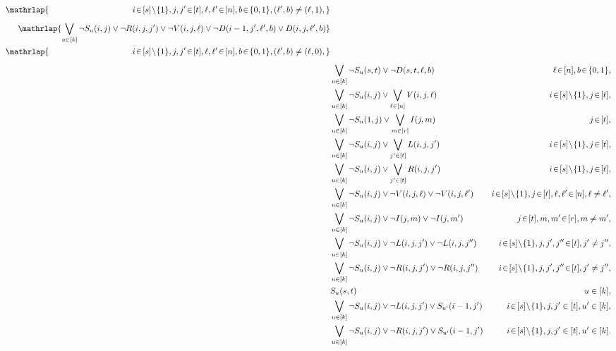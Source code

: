 \documentclass[10pt,a4paper]{article}
\theoremstyle{remark}
\newtheorem*{switching lemma}{Switching Lemma}
\newtheorem*{open problem}{Open Problem}
\theoremstyle{definition}
\begin{document}
\begin{alignat}{2}
\begin{split}
\mathrlap{  \, \, \, \, \, \, \, \; \; \; \quad \quad \qquad \qquad \qquad  i \! \in \! [s] \! \setminus \! \{1\}, j,j' \! \in \! [t], \ell,\ell' \! \in \! [n], b \! \in \! \{0,1\}, (\ell',b) \neq (\ell,1),} 
\end{split} \\[1ex]
\begin{split}
\label{rrefclause:res-R-transf} \mathrlap{ \bigvee_{u\in [k]} \neg S_u(i,j) \lor \neg R(i,j,j') \lor \neg V(i,j,\ell) \lor \neg D(i-1,j',\ell',b) \lor D(i,j,\ell',b)} \\
 \mathrlap{  \, \, \, \, \, \, \, \; \; \; \quad \quad \qquad \qquad \qquad  i \! \in \! [s] \! \setminus \! \{1\}, j,j' \! \in \! [t], \ell,\ell' \! \in \! [n], b \! \in \! \{0,1\}, (\ell',b) \neq (\ell,0),}
\end{split} \\[1ex]
\label{rrefclause:empty-clause} & \bigvee_{u \in [k]} \neg S_u(s,t) \lor \neg D(s,t,\ell,b) & \ell \! \in \! [n], b \! \in \! \{0,1\}, \\
\label{rrefclause:V-dom} & \bigvee_{u \in [k]} \neg S_u(i,j) \lor \bigvee_{\ell \in [n]} V(i,j,\ell) &  i \! \in \! [s] \! \setminus \! \{1\}, j\! \in \! [t], \\
\label{rrefclause:I-dom} & \bigvee_{u\in [k]} \neg S_u(1,j) \lor \bigvee_{m \in [r]} I(j,m) & j\! \in \! [t], \\
\label{rrefclause:L-dom} & \bigvee_{u\in [k]} \neg S_u(i,j) \lor \bigvee_{j' \in [t]} L(i,j,j')  &  i \! \in \! [s] \! \setminus \! \{1\}, j\! \in \! [t], \\
\label{rrefclause:R-dom} & \bigvee_{u\in [k]} \neg S_u(i,j) \lor \bigvee_{j' \in [t]} R(i,j,j')  &  i \! \in \! [s] \! \setminus \! \{1\}, j\! \in \! [t], \\
\label{rrefclause:V-func} & \bigvee_{u\in [k]} \neg S_u(i,j) \lor \neg V(i,j,\ell) \lor \neg V(i,j,\ell')  &   i \! \in \! [s] \! \setminus \! \{1\}, j\! \in \! [t], \ell,\ell' \! \in \! [n], \ell \neq \ell',\\
\label{rrefclause:I-func} & \bigvee_{u\in [k]} \neg S_u(i,j) \lor \neg I(j,m) \lor \neg I(j,m')  &  j\! \in \! [t], m,m' \! \in \! [r], m \neq m',\\
\label{rrefclause:L-func} & \bigvee_{u\in [k]} \neg S_u(i,j) \lor \neg L(i,j,j') \lor \neg L(i,j,j'')  &   i \! \in \! [s] \! \setminus \! \{1\}, j,j',j'' \! \in \! [t], j' \neq j'',\\
\label{rrefclause:R-func} & \bigvee_{u\in [k]} \neg S_u(i,j) \lor \neg R(i,j,j') \lor \neg R(i,j,j'')  &   i \! \in \! [s] \! \setminus \! \{1\}, j,j',j'' \! \in \! [t], j' \neq j'', \\
\label{rrefclause:Sst-true} & S_u(s,t) & u \in [k], \\
\label{rrefclause:L-unused-to-zero} & \bigvee_{u\in [k]} \neg S_u(i,j) \lor \neg L(i,j,j') \lor S_{u'}(i-1,j') & i \! \in \! [s] \! \setminus \! \{1\}, j,j' \in [t], u' \in [k], \\
\label{rrefclause:R-unused-to-zero} & \bigvee_{u\in [k]} \neg S_u(i,j) \lor \neg R(i,j,j') \lor S_{u'}(i-1,j') & i \! \in \! [s] \! \setminus \! \{1\}, j,j' \in [t], u' \in [k]. 
\end{alignat}
\endgroup
\end{document}
